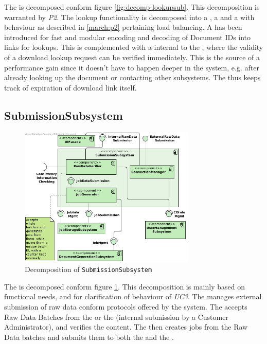 The  is decomposed conform figure \ref{fig:decomp-lookupsub}. This decomposition is warranted by \emph{P2}. The lookup functionality is decomposed into a , a  and a  with behaviour as described in \ref{march:p2} pertaining load balancing. A  has been introduced for fast and modular encoding and decoding of Document IDs into links for lookups. This is complemented with a  internal to the , where the validity of a download lookup request can be verified immediately. This is the source of a performance gain since it doesn't have to happen deeper in the system, e.g. after already looking up the document or contacting other subsystems. The  thus keeps track of expiration of download link itself.

\subsection{SubmissionSubsystem}
\begin{figure}[!htp]
    \centering
    \includegraphics[width=0.75\textwidth]{figures/Submission Subsystem.png}
    \caption{Decomposition of \texttt{SubmissionSubsystem}}\label{fig:decomp-submsub}
\end{figure}

The  is decomposed conform figure \ref{fig:decomp-submsub}. This decomposition is mainly based on functional needs, and for clarification of behaviour of \emph{UC3}. The  manages external submission of raw data conform protocols offered by the system. The  accepts Raw Data Batches from the  or the  (internal submission by a Customer Administrator), and verifies the content. The  then creates jobs from the Raw Data batches and submits them to both the  and the .

